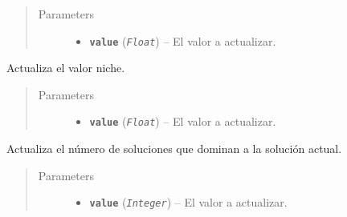 \documentclass[class=report, crop=false]{standalone}
\begin{document}
\begin{fulllineitems}
\begin{fulllineitems}
\begin{quote}
\begin{description}
\item[{Parameters}] \leavevmode\begin{itemize}
\item \textbf{\texttt{value}} (\emph{\texttt{Float}}) -- El valor a actualizar.
\end{itemize}
\end{description}\end{quote}

\end{fulllineitems}

\begin{fulllineitems}

Actualiza el valor niche.

\begin{quote}\begin{description}
\item[{Parameters}] \leavevmode\begin{itemize}
\item \textbf{\texttt{value}} (\emph{\texttt{Float}}) -- El valor a actualizar.
\end{itemize}
\end{description}\end{quote}

\end{fulllineitems}

\begin{fulllineitems}

Actualiza el número de soluciones que dominan a 
la solución actual.

\begin{quote}\begin{description}
\item[{Parameters}] \leavevmode\begin{itemize}
\item \textbf{\texttt{value}} (\emph{\texttt{Integer}}) -- El valor a actualizar.
\end{itemize}
\end{description}\end{quote}

\end{fulllineitems}

\begin{fulllineitems}


\end{fulllineitems}
\end{fulllineitems}
\end{document}
